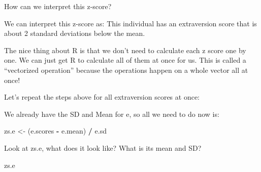 \documentclass[
]{article}
\newenvironment{Shaded}{\begin{snugshade}}{\end{snugshade}}
\newcommand{\CommentTok}[1]{\textcolor[rgb]{0.56,0.35,0.01}{\textit{#1}}}
\newcommand{\NormalTok}[1]{#1}
\newcommand{\OtherTok}[1]{\textcolor[rgb]{0.56,0.35,0.01}{#1}}
\newcommand{\SpecialCharTok}[1]{\textcolor[rgb]{0.81,0.36,0.00}{\textbf{#1}}}
\begin{document}
How can we interpret this z-score?

We can interpret this z-score as: This individual has an extraversion
score that is about 2 standard deviations below the mean.

The nice thing about R is that we don't need to calculate each z score
one by one. We can just get R to calculate all of them at once for us.
This is called a ``vectorized operation'' because the operations happen
on a whole vector all at once!

Let's repeat the steps above for all extraversion scores at once:

\begin{Shaded}
\end{Shaded}

We already have the SD and Mean for e, so all we need to do now is:

\begin{Shaded}
\begin{Highlighting}[]
\NormalTok{zs.e }\OtherTok{\textless{}{-}}\NormalTok{ (e.scores }\SpecialCharTok{{-}}\NormalTok{ e.mean) }\SpecialCharTok{/}\NormalTok{ e.sd}
\end{Highlighting}
\end{Shaded}

Look at zs.e, what does it look like? What is its mean and SD?

\begin{Shaded}
\begin{Highlighting}[]
\NormalTok{zs.e}
\end{Highlighting}
\end{Shaded}
\end{document}
